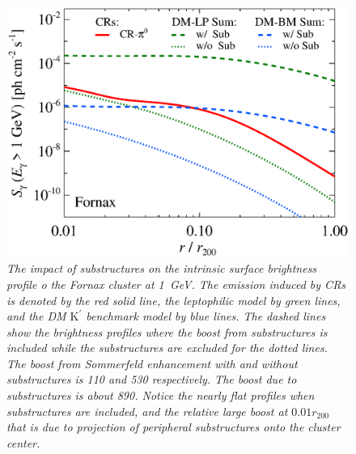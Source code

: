 \documentclass[10pt,aps,pra,reprint,amsmath,amsfonts,amssymb,showpacs,nofootinbib,floatfix]{revtex4-1}
\newcommand{\rmn}{\mathrm}
\newcommand{\Kp}{\rmn{K}^\prime}
\newcommand{\rvir}{r_{200}}
\begin{document}
\begin{figure}%
 \includegraphics[width=0.99\columnwidth]{figures/SB.resolved.v14.1GeV.SF700.noSuB.vs.SubMass.elmu.eps}
 \caption{\it The impact of substructures on the intrinsic surface
   brightness profile o the Fornax cluster at 1~GeV. The emission
   induced by CRs is denoted by the red solid line, the leptophilic
   model by green lines, and the DM $\Kp$ benchmark model by blue
   lines. The dashed lines show the brightness profiles where the
   boost from substructures is included while the substructures are
   excluded for the dotted lines. The boost from Sommerfeld
   enhancement with and without substructures is 110 and 530
   respectively. The boost due to substructures is about 890. Notice
   the nearly flat profiles when substructures are included, and the
   relative large boost at $0.01\rvir$ that is due to projection of
   peripheral substructures onto the cluster center.}
 \label{fig:SB_sub}
\end{figure}
\end{document}
